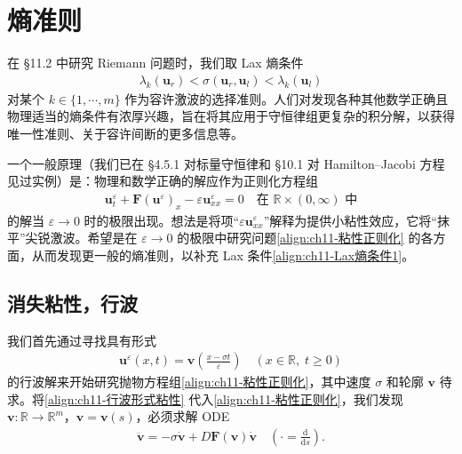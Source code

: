 \documentclass[../../main.tex]{subfiles}
\begin{document}
\section{熵准则}\label{section:ch11-熵准则}

在 \S11.2 中研究 Riemann 问题时，我们取 Lax 熵条件
\begin{align}
\lambda_k(\mathbf{u}_r)<\sigma(\mathbf{u}_r,\mathbf{u}_l)<\lambda_k(\mathbf{u}_l)
\label{align:ch11-Lax熵条件1}
\end{align}
对某个 $k\in\{1,\cdots,m\}$ 作为容许激波的选择准则。人们对发现各种其他数学正确且物理适当的熵条件有浓厚兴趣，旨在将其应用于守恒律组更复杂的积分解，以获得唯一性准则、关于容许间断的更多信息等。

一个一般原理（我们已在 \S4.5.1 对标量守恒律和 \S10.1 对 Hamilton--Jacobi 方程见过实例）是：物理和数学正确的解应作为正则化方程组
\begin{align}
\mathbf{u}^\varepsilon_t+\mathbf{F}(\mathbf{u}^\varepsilon)_x-\varepsilon\mathbf{u}^\varepsilon_{xx}=0 \quad \text{在 } \mathbb{R}\times(0,\infty) \text{ 中}
\label{align:ch11-粘性正则化}
\end{align}
的解当 $\varepsilon\to 0$ 时的极限出现。想法是将项``$\varepsilon\mathbf{u}^\varepsilon_{xx}$''解释为提供小粘性效应，它将``抹平''尖锐激波。希望是在 $\varepsilon\to 0$ 的极限中研究问题\eqref{align:ch11-粘性正则化} 的各方面，从而发现更一般的熵准则，以补充 Lax 条件\eqref{align:ch11-Lax熵条件1}。

\subsection{消失粘性，行波}\label{subsection:ch11-消失粘性行波}

我们首先通过寻找具有形式
\begin{align}
\mathbf{u}^\varepsilon(x,t)=\mathbf{v}\left(\frac{x-\sigma t}{\varepsilon}\right) \quad (x\in\mathbb{R},\;t\geqslant 0)
\label{align:ch11-行波形式粘性}
\end{align}
的行波解来开始研究抛物方程组\eqref{align:ch11-粘性正则化}，其中速度 $\sigma$ 和轮廓 $\mathbf{v}$ 待求。将\eqref{align:ch11-行波形式粘性} 代入\eqref{align:ch11-粘性正则化}，我们发现 $\mathbf{v}:\mathbb{R}\to\mathbb{R}^m$，$\mathbf{v}=\mathbf{v}(s)$，必须求解 ODE
\begin{align}
\ddot{\mathbf{v}}=-\sigma\dot{\mathbf{v}}+D\mathbf{F}(\mathbf{v})\dot{\mathbf{v}} \quad (\cdot=\tfrac{\mathrm{d}}{\mathrm{d}s}).
\label{align:ch11-行波ODE}
\end{align}
\end{document}
